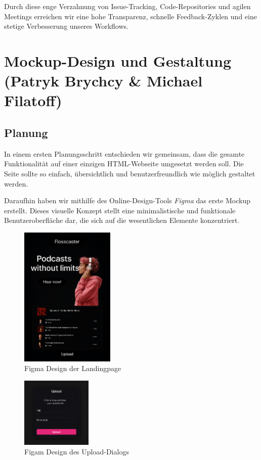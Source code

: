 \documentclass{article}
\begin{document}
Durch diese enge Verzahnung von Issue-Tracking, Code-Repositories und agilen Meetings erreichen wir eine hohe Transparenz, schnelle Feedback-Zyklen und eine stetige Verbesserung unseres Workflows.

\section{Mockup-Design und Gestaltung \small{(Patryk Brychcy \& Michael Filatoff)}}
\subsection{Planung}
In einem ersten Planungsschritt entschieden wir gemeinsam, dass die gesamte Funktionalität auf einer einzigen HTML-Webseite umgesetzt werden soll. Die Seite sollte so einfach, übersichtlich und benutzerfreundlich wie möglich gestaltet werden.

Daraufhin haben wir mithilfe des Online-Design-Tools \textit{Figma} das erste Mockup erstellt. Dieses visuelle Konzept stellt eine minimalistische und funktionale Benutzeroberfläche dar, die sich auf die wesentlichen Elemente konzentriert.

\begin{figure}[h]
  \caption{Figma Design der Landingpage}
  \centering
  \includegraphics[width=0.4\textwidth]{flosscaster1.png}
\end{figure}

\begin{figure}[h]
  \caption{Figam Design des Upload-Dialogs}
  \centering
  \includegraphics[width=0.3\textwidth]{flosscaster2.png}
\end{figure}
\end{document}
